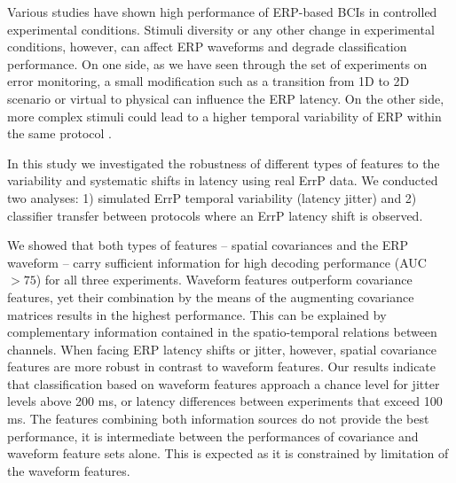 \documentclass[12pt]{iopart}
\begin{document}
Various studies have shown high 
performance of ERP-based BCIs in controlled experimental conditions.
Stimuli diversity or any other change in experimental conditions, however,
can affect ERP waveforms and degrade classification performance.
On one side, as we have seen through the set of experiments on error monitoring,
a small modification such as a transition from 1D to 2D scenario
or virtual to physical can influence the ERP latency.
On the other side, more complex stimuli
could lead to a higher temporal variability of ERP within the same protocol  \cite{arico_evaluation_2013}.


In this study we investigated the robustness of different types of features
to the variability and systematic shifts in latency using real ErrP data.
We conducted two analyses: 1) simulated ErrP temporal variability (latency jitter)
and 2) classifier transfer between protocols where an ErrP latency shift is observed.

We showed that both types of features -- spatial covariances and the ERP waveform --
carry sufficient information for high decoding performance (AUC $> 75$) for all three experiments.
Waveform features outperform covariance features, yet their combination
by the means of the augmenting covariance matrices results
in the highest performance. This can be explained by complementary 
information contained in the spatio-temporal relations between channels.
When facing ERP latency shifts or jitter, however,
spatial covariance features are more robust in contrast to waveform features.
Our results indicate that classification based on waveform features approach a chance level
for jitter levels above 200 ms, or latency differences
between experiments that exceed 100 ms.
The features combining both information sources do not provide 
the best performance, it is intermediate
between the performances of covariance and waveform feature sets alone.
This is expected as it is constrained by limitation
of the waveform features. 
\end{document}
